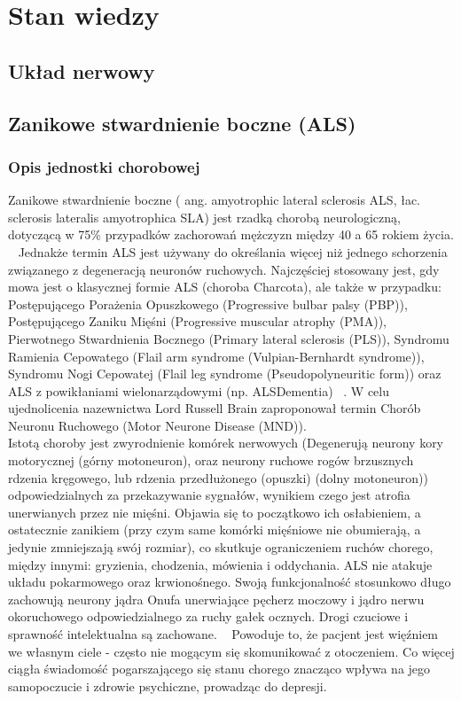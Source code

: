 \documentclass[twoside,a4paper]{book}
\begin{document}
\chapter{Stan wiedzy}
\section{Układ nerwowy}
\section{Zanikowe  stwardnienie boczne (ALS)}
\subsection{ Opis jednostki chorobowej}

Zanikowe stwardnienie boczne ( ang. amyotrophic lateral sclerosis ALS, łac. sclerosis lateralis
amyotrophica SLA) jest rzadką chorobą neurologiczną, dotyczącą  w 75\% przypadków zachorowań mężczyzn między 40 a 65 rokiem życia. ~\cite{neurology} Jednakże termin ALS jest używany do określania więcej niż jednego schorzenia związanego z degeneracją neuronów ruchowych.  Najczęściej stosowany jest, gdy mowa jest o klasycznej formie ALS (choroba Charcota), ale także w przypadku: Postępującego Porażenia Opuszkowego (Progressive bulbar palsy (PBP)), Postępującego Zaniku Mięśni (Progressive muscular atrophy (PMA)), Pierwotnego Stwardnienia Bocznego (Primary lateral sclerosis  (PLS)), Syndromu Ramienia Cepowatego (Flail arm syndrome (Vulpian-Bernhardt syndrome)),  Syndromu Nogi Cepowatej (Flail leg syndrome  (Pseudopolyneuritic form)) oraz ALS  z powikłaniami wielonarządowymi  (np. ALSDementia) ~\cite{alsWij}. W celu ujednolicenia nazewnictwa Lord Russell Brain zaproponował termin Chorób Neuronu Ruchowego (Motor Neurone Disease (MND)). ~\cite{alsWij}\\
Istotą choroby jest zwyrodnienie komórek nerwowych (Degenerują neurony kory motorycznej (górny motoneuron), oraz neurony ruchowe rogów brzusznych rdzenia kręgowego, lub rdzenia przedłużonego (opuszki) (dolny motoneuron)) odpowiedzialnych za przekazywanie sygnałów, wynikiem czego jest atrofia unerwianych przez nie mięśni. Objawia się to początkowo ich osłabieniem, a ostatecznie zanikiem (przy czym same komórki mięśniowe nie obumierają, a jedynie zmniejszają swój rozmiar), co skutkuje ograniczeniem ruchów chorego, między innymi: gryzienia, chodzenia, mówienia i oddychania. ALS nie atakuje układu pokarmowego oraz krwionośnego. Swoją funkcjonalność stosunkowo długo zachowują neurony jądra Onufa unerwiające pęcherz moczowy i jądro nerwu okoruchowego odpowiedzialnego za ruchy gałek ocznych. Drogi czuciowe i sprawność intelektualna są zachowane. ~\cite{parkinsonALS} Powoduje to, że pacjent jest więźniem we własnym ciele - często nie mogącym się skomunikować z otoczeniem.  Co więcej ciągła świadomość pogarszającego się stanu chorego znacząco wpływa na jego samopoczucie i zdrowie psychiczne, prowadząc do depresji. \\
\end{document}
